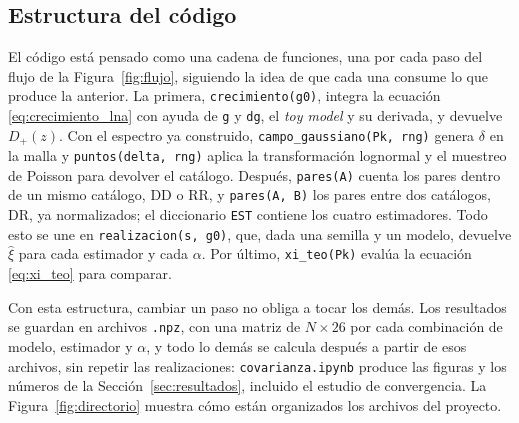 \documentclass[letterpaper, 12pt]{article}
\newcommand{\DD}{\mathrm{DD}}
\newcommand{\DR}{\mathrm{DR}}
\newcommand{\RR}{\mathrm{RR}}
\begin{document}
        \subsection{Estructura del código}

            El código está pensado como una cadena de funciones, una por cada paso del flujo de la Figura~\ref{fig:flujo}, siguiendo la idea de que cada una consume lo que produce la anterior. La primera, \texttt{crecimiento(g0)}, integra la ecuación \eqref{eq:crecimiento_lna} con ayuda de \texttt{g} y \texttt{dg}, el \emph{toy model} y su derivada, y devuelve $D_+(z)$. Con el espectro ya construido, \texttt{campo\_gaussiano(Pk, rng)} genera $\delta$ en la malla y \texttt{puntos(delta, rng)} aplica la transformación lognormal y el muestreo de Poisson para devolver el catálogo. Después, \texttt{pares(A)} cuenta los pares dentro de un mismo catálogo, $\DD$ o $\RR$, y \texttt{pares(A, B)} los pares entre dos catálogos, $\DR$, ya normalizados; el diccionario \texttt{EST} contiene los cuatro estimadores. Todo esto se une en \texttt{realizacion(s, g0)}, que, dada una semilla y un modelo, devuelve $\hat\xi$ para cada estimador y cada $\alpha$. Por último, \texttt{xi\_teo(Pk)} evalúa la ecuación \eqref{eq:xi_teo} para comparar.

            Con esta estructura, cambiar un paso no obliga a tocar los demás. Los resultados se guardan en archivos \texttt{.npz}, con una matriz de $N \times 26$ por cada combinación de modelo, estimador y $\alpha$, y todo lo demás se calcula después a partir de esos archivos, sin repetir las realizaciones: \texttt{covarianza.ipynb} produce las figuras y los números de la Sección~\ref{sec:resultados}, incluido el estudio de convergencia. La Figura~\ref{fig:directorio} muestra cómo están organizados los archivos del proyecto.
\end{document}
